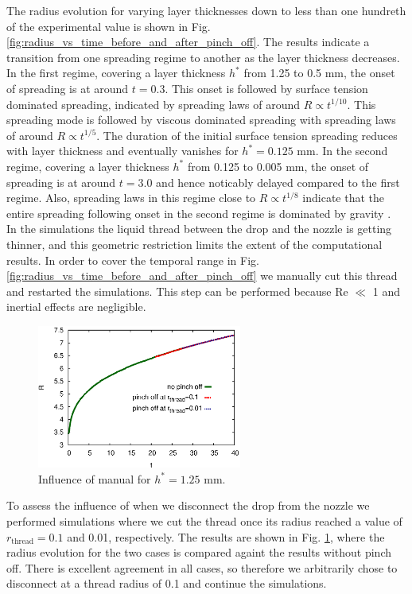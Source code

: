 \documentclass[aip,graphicx]{revtex4-1}
\newcommand{\sym}[1]{\text{#1}} \newcommand{\dif}{\mathrm{d}}
\begin{document}
The radius evolution for varying layer thicknesses down to less than
one hundreth of the experimental value is shown in Fig.
\ref{fig:radius_vs_time_before_and_after_pinch_off}.  The results
indicate a transition from one spreading regime to another as the
layer thickness decreases.  In the first regime, covering a layer
thickness $h^*$ from 1.25 to 0.5 mm, the onset of spreading is at
around $t=0.3$.  This onset is followed by surface tension dominated
spreading, indicated by spreading laws of around $R \propto t^{1/10}$.
This spreading mode is followed by viscous dominated spreading with
spreading laws of around $R \propto t^{1/5}$.  The duration of the
initial surface tension spreading reduces with layer thickness and
eventually vanishes for $h^*=0.125$ mm.  In the second regime,
covering a layer thickness $h^*$ from 0.125 to 0.005 mm, the onset of
spreading is at around $t=3.0$ and hence noticably delayed compared to
the first regime.  Also, spreading laws in this regime close to $R
\propto t^{1/8}$ indicate that the entire spreading following onset in
the second regime is dominated by gravity
\cite{cazabat1986dynamics}. \\


In the simulations the liquid thread between the drop and the nozzle
is getting thinner, and this geometric restriction limits the extent
of the computational results.  In order to cover the temporal range in
Fig. \ref{fig:radius_vs_time_before_and_after_pinch_off} we manually
cut this thread and restarted the simulations.  This step can be
performed because Re $\ll$ 1 and inertial effects are negligible.

\begin{figure}[!ht]
\centering
\includegraphics[width=0.6\textwidth]{figures/radius_vs_time_influence_pinch_off.eps}
\caption{Influence of manual for $h^*=1.25$ mm.}
\label{fig:radius_vs_time_influence_pinch_off}
\end{figure}

To assess the influence of when we disconnect the drop from the nozzle
we performed simulations where we cut the thread once its radius
reached a value of $r_{\sym{thread}}=0.1$ and 0.01, respectively.  The
results are shown in Fig.
\ref{fig:radius_vs_time_influence_pinch_off}, where the radius
evolution for the two cases is compared againt the results without
pinch off.  There is excellent agreement in all cases, so therefore we
arbitrarily chose to disconnect at a thread radius of 0.1 and continue
the simulations. \\
\end{document}
